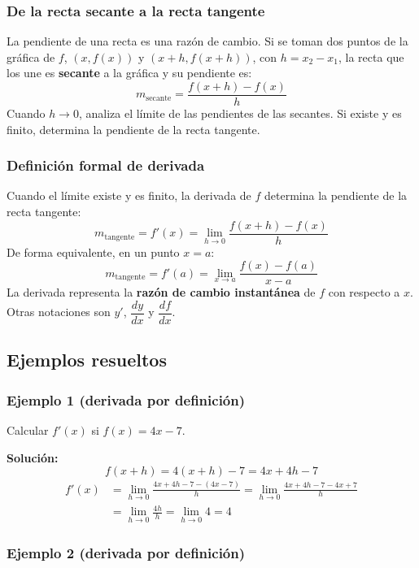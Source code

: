 \documentclass[12pt]{article}
\begin{document}
\subsubsection{De la recta secante a la recta tangente}


La pendiente de una recta es una razón de cambio. Si se toman dos puntos de la gráfica de $f$, $(x, f(x))$ y $(x+h, f(x+h))$, con $h = x_2 - x_1$, la recta que los une es \textbf{secante} a la gráfica y su pendiente es:
\[
m_{\text{secante}} = \frac{f(x+h) - f(x)}{h}
\]
Cuando $h \to 0$, analiza el límite de las pendientes de las secantes. Si existe y es finito, determina la pendiente de la recta tangente.



\subsubsection{Definición formal de derivada}


Cuando el límite existe y es finito, la derivada de $f$ determina la pendiente de la recta tangente:
\[
m_{\text{tangente}} = f'(x) = \lim_{h \to 0} \frac{f(x+h) - f(x)}{h}
\]
De forma equivalente, en un punto $x = a$:
\[
m_{\text{tangente}} = f'(a) = \lim_{x \to a} \frac{f(x) - f(a)}{x - a}
\]
La derivada representa la \textbf{razón de cambio instantánea} de $f$ con respecto a $x$. Otras notaciones son $y'$, $\dfrac{dy}{dx}$ y $\dfrac{df}{dx}$.



\subsection{Ejemplos resueltos}

\subsubsection{Ejemplo 1 (derivada por definición)}


Calcular $f'(x)$ si $f(x) = 4x - 7$.

\textbf{Solución:}
\[
f(x+h) = 4(x+h) - 7 = 4x + 4h - 7
\]
\begin{align*}
f'(x) &= \lim_{h \to 0} \frac{4x + 4h - 7 - (4x - 7)}{h} = \lim_{h \to 0} \frac{4x + 4h - 7 - 4x + 7}{h} \\
&= \lim_{h \to 0} \frac{4h}{h} = \lim_{h \to 0} 4 = 4
\end{align*}



\subsubsection{Ejemplo 2 (derivada por definición)}
\end{document}
